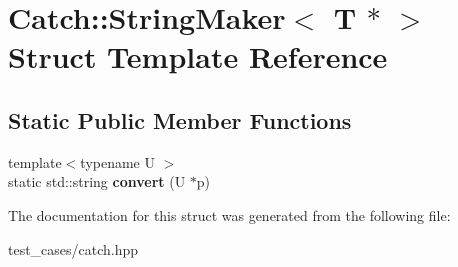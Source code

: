 \hypertarget{structCatch_1_1StringMaker_3_01T_01_5_01_4}{}\section{Catch\+:\+:String\+Maker$<$ T $\ast$ $>$ Struct Template Reference}
\label{structCatch_1_1StringMaker_3_01T_01_5_01_4}
\subsection*{Static Public Member Functions}
\begin{DoxyCompactItemize}
\item 
\mbox{\label{structCatch_1_1StringMaker_3_01T_01_5_01_4_a2adbc75c99d71b8323f4052bcb0815c9}} 
{\footnotesize template$<$typename U $>$ }\\static std\+::string {\bfseries convert} (U $\ast$p)
\end{DoxyCompactItemize}


The documentation for this struct was generated from the following file\+:\begin{DoxyCompactItemize}
\item 
test\+\_\+cases/catch.\+hpp\end{DoxyCompactItemize}
